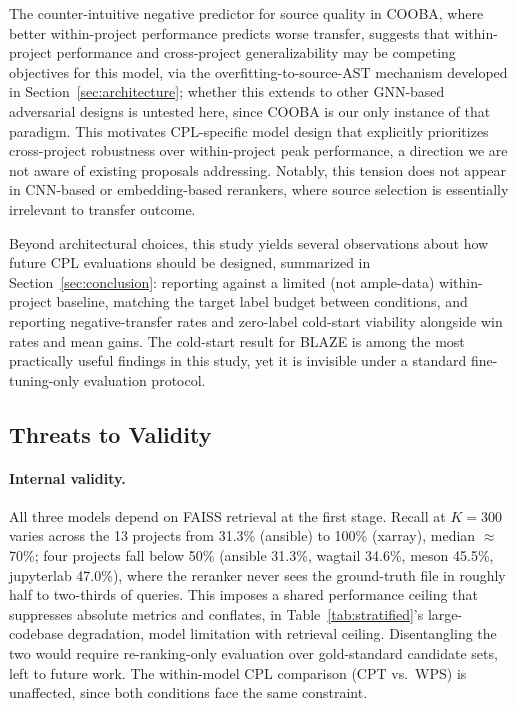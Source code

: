 \documentclass[a4paper,fleqn]{cas-dc}
\begin{document}
The counter-intuitive negative predictor for source quality in COOBA,
where better within-project performance predicts worse transfer,
suggests that within-project performance and cross-project generalizability may
be competing objectives for this model, via the overfitting-to-source-AST
mechanism developed in Section~\ref{sec:architecture}; whether
this extends to other GNN-based adversarial designs is untested here, since COOBA is
our only instance of that paradigm.
This motivates CPL-specific model design that explicitly prioritizes cross-project
robustness over within-project peak performance, a direction we are not aware of
existing proposals addressing. Notably, this tension does not appear in
CNN-based or embedding-based rerankers, where source selection is essentially
irrelevant to transfer outcome.

Beyond architectural choices, this study yields several observations about how
future CPL evaluations should be designed, summarized in Section~\ref{sec:conclusion}:
reporting against a limited (not ample-data) within-project baseline, matching
the target label budget between conditions, and reporting negative-transfer rates and
zero-label cold-start viability alongside win rates and mean gains. The cold-start
result for BLAZE is among the most practically useful findings in this study, yet it
is invisible under a standard fine-tuning-only evaluation protocol.

\subsection{Threats to Validity}
\label{sec:threats}

\paragraph{Internal validity.}
All three models depend on FAISS retrieval at the first stage. Recall at
$K = 300$ varies across the 13 projects from 31.3\% (ansible) to 100\%
(xarray), median $\approx$70\%; four projects fall below 50\% (ansible
31.3\%, wagtail 34.6\%, meson 45.5\%, jupyterlab 47.0\%), where the reranker never sees the
ground-truth file in roughly half to two-thirds of queries. This imposes a
shared performance ceiling that suppresses absolute metrics and conflates,
in Table~\ref{tab:stratified}'s large-codebase degradation, model limitation
with retrieval ceiling. Disentangling the two would require
re-ranking-only evaluation over gold-standard candidate sets, left to future
work. The within-model CPL comparison (CPT vs.\ WPS) is unaffected, since
both conditions face the same constraint.
\end{document}

